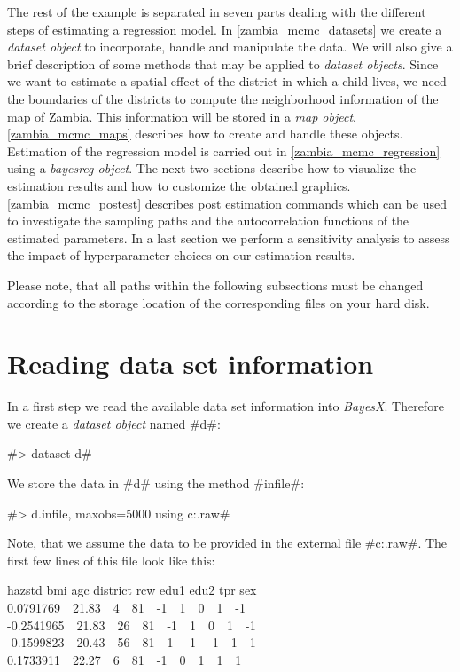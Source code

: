 \documentclass[11pt,a4paper,twoside]{bayesxreport}
\begin{document}
The rest of the example is separated in seven parts dealing with the
different steps of estimating a regression model. In
\autoref{zambia_mcmc_datasets} we create a {\em dataset object} to
incorporate, handle and manipulate the data. We will also give a
brief description of some methods that may be applied to {\em
dataset objects}. Since we want to estimate a spatial effect of the
district in which a child lives, we need the boundaries of the
districts to compute the neighborhood information of the map of
Zambia. This information will be stored in a {\em map object}.
\autoref{zambia_mcmc_maps} describes how to create and handle these
objects. Estimation of the regression model is carried out in
\autoref{zambia_mcmc_regression} using a {\em bayesreg object}. The
next two sections describe how to visualize the estimation results
and how to customize the obtained graphics.
\autoref{zambia_mcmc_postest} describes post estimation commands
which can be used to investigate the sampling paths and the
autocorrelation functions of the estimated parameters. In a last
section we perform a sensitivity analysis to assess the impact of
hyperparameter choices on our estimation results.

Please note, that all paths within the following subsections must be
changed according to the storage location of the corresponding files
on your hard disk.

\section{Reading data set
information}\label{zambia_mcmc_datasets}

In a first step we read the available data set information into {\it
BayesX}. Therefore we create a {\it dataset object} named #d#:

#> dataset d#

We store the data in #d# using the method #infile#:

#> d.infile, maxobs=5000 using c:\data\zambia.raw#

Note, that we assume the data to be provided in the external file
#c:\data\zambia.raw#. The first few lines of this file look like
this:

{\footnotesize
 hazstd bmi agc district rcw edu1 edu2 tpr sex\\
 0.0791769 \,\, 21.83 \,\, 4 \,\, 81 \,\, -1 \,\, 1 \,\, 0 \,\, 1 \,\, -1\\
 -0.2541965 \,\, 21.83 \,\, 26 \,\, 81 \,\, -1 \,\, 1 \,\, 0 \,\, 1 \,\, -1\\
 -0.1599823 \,\, 20.43 \,\, 56 \,\, 81 \,\, 1 \,\, -1 \,\, -1 \,\, 1 \,\, 1\\
 0.1733911 \,\, 22.27 \,\, 6 \,\, 81 \,\, -1 \,\, 0 \,\, 1 \,\, 1 \,\, 1}
\end{document}
